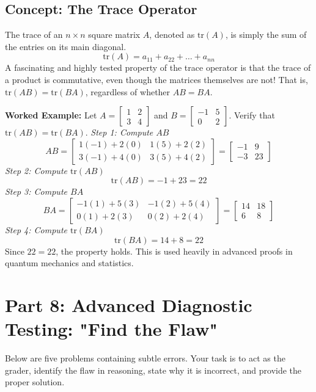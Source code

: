 \documentclass{article}
\begin{document}
\subsection*{Concept: The Trace Operator}
The trace of an $n \times n$ square matrix $A$, denoted as $\text{tr}(A)$, is simply the sum of the entries on its main diagonal. 
\[ \text{tr}(A) = a_{11} + a_{22} + \dots + a_{nn} \]
A fascinating and highly tested property of the trace operator is that the trace of a product is commutative, even though the matrices themselves are not! That is, $\text{tr}(AB) = \text{tr}(BA)$, regardless of whether $AB = BA$.

\textbf{Worked Example:}
Let $A = \begin{bmatrix} 1 & 2 \\ 3 & 4 \end{bmatrix}$ and $B = \begin{bmatrix} -1 & 5 \\ 0 & 2 \end{bmatrix}$. Verify that $\text{tr}(AB) = \text{tr}(BA)$.
\textit{Step 1: Compute $AB$}
\[ AB = \begin{bmatrix} 1(-1)+2(0) & 1(5)+2(2) \\ 3(-1)+4(0) & 3(5)+4(2) \end{bmatrix} = \begin{bmatrix} -1 & 9 \\ -3 & 23 \end{bmatrix} \]
\textit{Step 2: Compute $\text{tr}(AB)$}
\[ \text{tr}(AB) = -1 + 23 = 22 \]
\textit{Step 3: Compute $BA$}
\[ BA = \begin{bmatrix} -1(1)+5(3) & -1(2)+5(4) \\ 0(1)+2(3) & 0(2)+2(4) \end{bmatrix} = \begin{bmatrix} 14 & 18 \\ 6 & 8 \end{bmatrix} \]
\textit{Step 4: Compute $\text{tr}(BA)$}
\[ \text{tr}(BA) = 14 + 8 = 22 \]
Since $22 = 22$, the property holds. This is used heavily in advanced proofs in quantum mechanics and statistics.

\newpage
\section*{Part 8: Advanced Diagnostic Testing: "Find the Flaw"}

Below are five problems containing subtle errors. Your task is to act as the grader, identify the flaw in reasoning, state why it is incorrect, and provide the proper solution.
\end{document}
